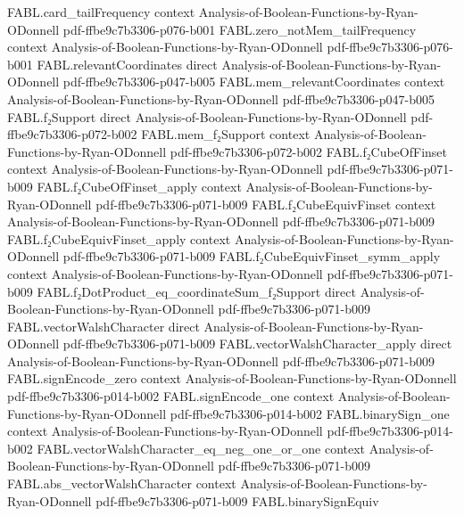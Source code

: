 \begin{theorem}
\proofstep
  {FABL.card_tailFrequency}
  {context}
  {Analysis-of-Boolean-Functions-by-Ryan-ODonnell}
  {pdf-ffbe9c7b3306-p076-b001}
\proofstep
  {FABL.zero_notMem_tailFrequency}
  {context}
  {Analysis-of-Boolean-Functions-by-Ryan-ODonnell}
  {pdf-ffbe9c7b3306-p076-b001}
\proofstep
  {FABL.relevantCoordinates}
  {direct}
  {Analysis-of-Boolean-Functions-by-Ryan-ODonnell}
  {pdf-ffbe9c7b3306-p047-b005}
\proofstep
  {FABL.mem_relevantCoordinates}
  {context}
  {Analysis-of-Boolean-Functions-by-Ryan-ODonnell}
  {pdf-ffbe9c7b3306-p047-b005}
\proofstep
  {FABL.f₂Support}
  {direct}
  {Analysis-of-Boolean-Functions-by-Ryan-ODonnell}
  {pdf-ffbe9c7b3306-p072-b002}
\proofstep
  {FABL.mem_f₂Support}
  {context}
  {Analysis-of-Boolean-Functions-by-Ryan-ODonnell}
  {pdf-ffbe9c7b3306-p072-b002}
\proofstep
  {FABL.f₂CubeOfFinset}
  {context}
  {Analysis-of-Boolean-Functions-by-Ryan-ODonnell}
  {pdf-ffbe9c7b3306-p071-b009}
\proofstep
  {FABL.f₂CubeOfFinset_apply}
  {context}
  {Analysis-of-Boolean-Functions-by-Ryan-ODonnell}
  {pdf-ffbe9c7b3306-p071-b009}
\proofstep
  {FABL.f₂CubeEquivFinset}
  {context}
  {Analysis-of-Boolean-Functions-by-Ryan-ODonnell}
  {pdf-ffbe9c7b3306-p071-b009}
\proofstep
  {FABL.f₂CubeEquivFinset_apply}
  {context}
  {Analysis-of-Boolean-Functions-by-Ryan-ODonnell}
  {pdf-ffbe9c7b3306-p071-b009}
\proofstep
  {FABL.f₂CubeEquivFinset_symm_apply}
  {context}
  {Analysis-of-Boolean-Functions-by-Ryan-ODonnell}
  {pdf-ffbe9c7b3306-p071-b009}
\proofstep
  {FABL.f₂DotProduct_eq_coordinateSum_f₂Support}
  {direct}
  {Analysis-of-Boolean-Functions-by-Ryan-ODonnell}
  {pdf-ffbe9c7b3306-p071-b009}
\proofstep
  {FABL.vectorWalshCharacter}
  {direct}
  {Analysis-of-Boolean-Functions-by-Ryan-ODonnell}
  {pdf-ffbe9c7b3306-p071-b009}
\proofstep
  {FABL.vectorWalshCharacter_apply}
  {direct}
  {Analysis-of-Boolean-Functions-by-Ryan-ODonnell}
  {pdf-ffbe9c7b3306-p071-b009}
\proofstep
  {FABL.signEncode_zero}
  {context}
  {Analysis-of-Boolean-Functions-by-Ryan-ODonnell}
  {pdf-ffbe9c7b3306-p014-b002}
\proofstep
  {FABL.signEncode_one}
  {context}
  {Analysis-of-Boolean-Functions-by-Ryan-ODonnell}
  {pdf-ffbe9c7b3306-p014-b002}
\proofstep
  {FABL.binarySign_one}
  {context}
  {Analysis-of-Boolean-Functions-by-Ryan-ODonnell}
  {pdf-ffbe9c7b3306-p014-b002}
\proofstep
  {FABL.vectorWalshCharacter_eq_neg_one_or_one}
  {context}
  {Analysis-of-Boolean-Functions-by-Ryan-ODonnell}
  {pdf-ffbe9c7b3306-p071-b009}
\proofstep
  {FABL.abs_vectorWalshCharacter}
  {context}
  {Analysis-of-Boolean-Functions-by-Ryan-ODonnell}
  {pdf-ffbe9c7b3306-p071-b009}
\proofstep
  {FABL.binarySignEquiv}

\end{theorem}
